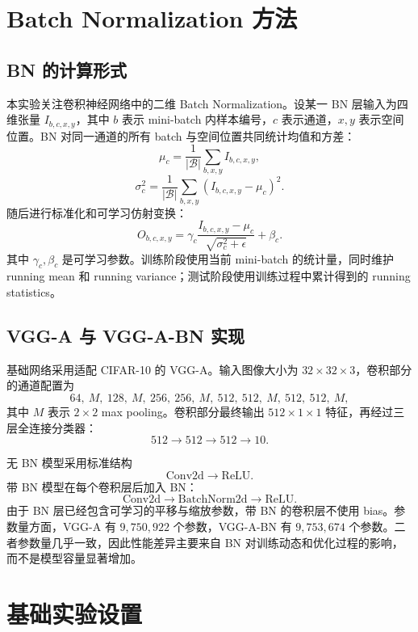\documentclass[UTF8,a4paper,11pt]{ctexart}
\begin{document}
\section{Batch Normalization 方法}

\subsection{BN 的计算形式}

本实验关注卷积神经网络中的二维 Batch Normalization。设某一 BN 层输入为四维张量 $I_{b,c,x,y}$，其中 $b$ 表示 mini-batch 内样本编号，$c$ 表示通道，$x,y$ 表示空间位置。BN 对同一通道的所有 batch 与空间位置共同统计均值和方差：
\begin{equation}
  \mu_c = \frac{1}{|\mathcal{B}|}\sum_{b,x,y} I_{b,c,x,y},
\end{equation}
\begin{equation}
  \sigma_c^2 = \frac{1}{|\mathcal{B}|}\sum_{b,x,y}(I_{b,c,x,y}-\mu_c)^2.
\end{equation}
随后进行标准化和可学习仿射变换：
\begin{equation}
  O_{b,c,x,y}
  =
  \gamma_c
  \frac{I_{b,c,x,y}-\mu_c}{\sqrt{\sigma_c^2+\epsilon}}
  + \beta_c .
\end{equation}
其中 $\gamma_c,\beta_c$ 是可学习参数。训练阶段使用当前 mini-batch 的统计量，同时维护 running mean 和 running variance；测试阶段使用训练过程中累计得到的 running statistics。

\subsection{VGG-A 与 VGG-A-BN 实现}

基础网络采用适配 CIFAR-10 的 VGG-A。输入图像大小为 $32\times32\times3$，卷积部分的通道配置为
\[
64,\ M,\ 128,\ M,\ 256,\ 256,\ M,\ 512,\ 512,\ M,\ 512,\ 512,\ M,
\]
其中 $M$ 表示 $2\times2$ max pooling。卷积部分最终输出 $512\times1\times1$ 特征，再经过三层全连接分类器：
\[
512 \rightarrow 512 \rightarrow 512 \rightarrow 10.
\]

无 BN 模型采用标准结构
\[
\mathrm{Conv2d} \rightarrow \mathrm{ReLU}.
\]
带 BN 模型在每个卷积层后加入 BN：
\[
\mathrm{Conv2d} \rightarrow \mathrm{BatchNorm2d} \rightarrow \mathrm{ReLU}.
\]
由于 BN 层已经包含可学习的平移与缩放参数，带 BN 的卷积层不使用 bias。参数量方面，VGG-A 有 $9{,}750{,}922$ 个参数，VGG-A-BN 有 $9{,}753{,}674$ 个参数。二者参数量几乎一致，因此性能差异主要来自 BN 对训练动态和优化过程的影响，而不是模型容量显著增加。

\section{基础实验设置}
\end{document}
